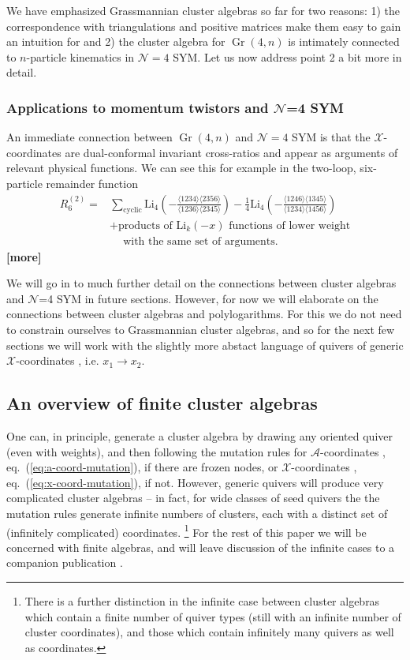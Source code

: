 \documentclass[11pt]{article}
\DeclareMathOperator{\Gr}{Gr}
\def\nl{\nonumber\\}
\def\nn{\nonumber}
\def\x{\mathcal{X}}
\def\xcoords{$\mathcal{X}$-coordinates }
\def\acoords{$\mathcal{A}$-coordinates }
\def\draftnote#1{{\bf [#1]}}
\def\pdfeq#1{\texorpdfstring{$#1$}{a}}
\begin{document}
We have emphasized Grassmannian cluster algebras so far for two reasons: 1) the correspondence with triangulations and positive matrices make them easy to gain an intuition for and 2) the cluster algebra for $\Gr(4,n)$ is intimately connected to $n$-particle kinematics in $\mathcal{N}=4$ SYM. Let us now address point 2 a bit more in detail.


\subsubsection*{Applications to momentum twistors and \pdfeq{\mathcal{N}}=4 SYM}

An immediate connection between $\Gr(4,n)$ and $\mathcal{N}=4$ SYM is that the $\x$-coordinates are dual-conformal invariant cross-ratios and appear as arguments of relevant physical functions. We can see this for example in the two-loop, six-particle remainder function 
\begin{align}
	R^{(2)}_6 = &\sum_{\text{cyclic}} \text{Li}_4\left(-\frac{\langle 1234 \rangle \langle 2356 \rangle}{\langle 1236 \rangle \langle 2345 \rangle}\right) - \frac{1}{4} \text{Li}_4 \left(-\frac{\langle 1246 \rangle \langle 1345 \rangle}{\langle 1234 \rangle \langle 1456 \rangle}\right)\nl
	&+\text{products of } \text{Li}_{k}(-x) \text{ functions of lower weight}\\ &\quad~\text{with the same set of arguments.}\nn
\end{align}
\draftnote{more}

We will go in to much further detail on the connections between cluster algebras and $\mathcal{N}$=4 SYM in future sections. However, for now we will elaborate on the connections between cluster algebras and polylogarithms. For this we do not need to constrain ourselves to Grassmannian cluster algebras, and so for the next few sections we will work with the slightly more abstact language of quivers of generic \xcoords, i.e. $x_1 \to x_2$. 

\subsection{An overview of finite cluster algebras}\label{sec:finite-algebras}

One can, in principle, generate a cluster algebra by drawing any oriented quiver (even with weights), and then following the mutation rules for \acoords, eq.~(\ref{eq:a-coord-mutation}), if there are frozen nodes, or \xcoords, eq.~(\ref{eq:x-coord-mutation}), if not. However, generic quivers will produce very complicated cluster algebras -- in fact, for wide classes of seed quivers the the mutation rules generate infinite numbers of clusters, each with a distinct set of (infinitely complicated) coordinates. \footnote{There is a further distinction in the infinite case between cluster algebras which contain a finite number of quiver types (still with an infinite number of cluster coordinates), and those which contain infinitely many quivers as well as coordinates.} For the rest of this paper we will be concerned with finite algebras, and will leave discussion of the infinite cases to a companion publication \cite{}. 
\end{document}
